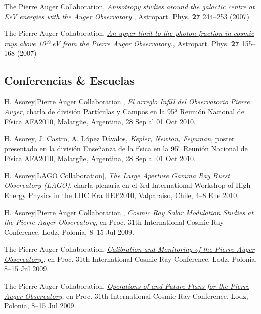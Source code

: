 \documentclass[11pt, a4paper]{article}
\newcommand{\years}[1]{\marginnote{\scriptsize #1}}
\begin{document}
\years{2007}The Pierre Auger Collaboration, \href{http://dx.doi.org/10.1016/j.astropartphys.2006.11.002}{\emph{Anisotropy studies around the galactic centre at EeV energies with the Auger Observatory.}},  Astropart. Phys. {\bf 27} 244--253 (2007)

\years{2007}The Pierre Auger Collaboration, \href{http://dx.doi.org/10.1016/j.astropartphys.2006.10.004}{\emph{An upper limit to the photon fraction in cosmic rays above 10$^{19}$\,eV from the Pierre Auger Observatory.}}, Astropart. Phys. {\bf 27} 155--168 (2007)

\subsection*{Conferencias \& Escuelas}
\noindent

\years{2010}H. Asorey[Pierre Auger Collaboration], \href{http://95rnf.afa.webfactional.com/tex\_files/Resumenes/DPyC/PyC\_6.pdf}{\emph{El arreglo Infill del
Observatorio Pierre Auger}}, charla de división Partículas y Campos en la
95$^\mathrm{a}$ Reunión Nacional de Física AFA2010, Malargüe, Argentina, 28 Sep
al 01 Oct 2010.

\years{2010}H. Asorey, J. Castro, A. López Dávalos, \href{http://95rnf.afa.webfactional.com/tex\_files/Resumenes/EF/asorey.pdf}{\emph{Kepler, Newton, Feynman}}, poster presentado en la división Enseñanza de la física en la 95$^\mathrm{a}$ Reunión Nacional de Física AFA2010, Malargüe, Argentina, 28 Sep al 01 Oct 2010.

\years{2010}H. Asorey[LAGO Collaboration], {\emph{The Large Aperture Gamma Ray Burst Observatory (LAGO)}}, charla plenaria en el 3rd International Workshop of High Energy Physics in the LHC Era HEP2010, Valparaiso, Chile, 4--8 Ene 2010.

\years{2009}H. Asorey[Pierre Auger Collaboration], {\emph{Cosmic Ray Solar Modulation Studies at the Pierre Auger Observatory}}, en Proc. 31th International Cosmic Ray Conference, Lodz, Polonia, 8--15 Jul 2009.

\years{2009}The Pierre Auger Collaboration, \href{http://arxiv.org/abs/0906.2358}{\emph{Calibration and Monitoring of the Pierre Auger Observatory.}}, en Proc. 31th International Cosmic Ray Conference, Lodz, Polonia, 8--15 Jul 2009.

\years{2009}The Pierre Auger Collaboration, \href{http://arxiv.org/abs/0906.2354}{\emph{Operations of and Future Plans for the Pierre Auger Observatory}}, en Proc. 31th International Cosmic Ray Conference, Lodz, Polonia, 8--15 Jul 2009.
\end{document}
